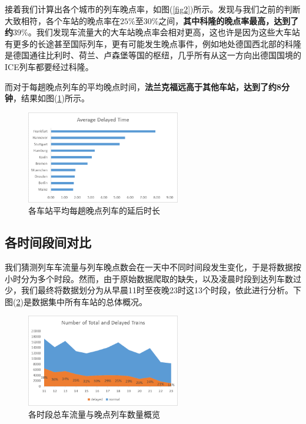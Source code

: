 \documentclass[lang=cn,12pt,a4paper,cite=authoryear]{elegantpaper}
\begin{document}
接着我们计算出各个城市的列车晚点率，如图(\ref{fig2})所示。发现与我们之前的判断大致相符，各个车站的晚点率在$25\%$至$30\%$之间，\textbf{其中科隆的晚点率最高，达到了约$39\%$}。我们发现车流量大的大车站晚点率会相对更高，这也许是因为这些大车站有更多的长途甚至国际列车，更有可能发生晚点事件，例如地处德国西北部的科隆是德国通往比利时、荷兰、卢森堡等国的枢纽，几乎所有从这一方向出德国国境的ICE列车都要经过科隆。

而对于每趟晚点列车的平均晚点时间，\textbf{法兰克福远高于其他车站，达到了约8分钟}，结果如图(\ref{fig3})所示。

\begin{figure}[H]
	\centering
	\includegraphics[width=0.6\textwidth]{image/avg_time.png}
	\caption{各车站平均每趟晚点列车的延后时长}
	\label{fig3}
\end{figure}

\subsection{各时间段间对比}

我们猜测列车车流量与列车晚点数会在一天中不同时间段发生变化，于是将数据按小时分为多个时段。然而，由于原始数据爬取的缺失，以及凌晨时段到达列车数过少，我们最终将数据划分为从早晨11时至夜晚23时这13个时段，依此进行分析。下图(\ref{fig4})是数据集中所有车站的总体概况。

\begin{figure}[H]
	\centering
	\includegraphics[width=0.6\textwidth]{image/time_total.png}
	\caption{各时段总车流量与晚点列车数量概览}
	\label{fig4}
\end{figure}
\end{document}
